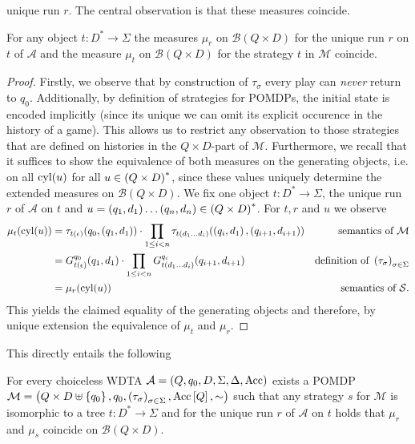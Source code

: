 unique run $r$. The central observation is that these measures coincide.
\begin{lemma}
  For any object $t:D^{*}\rightarrow\Sigma$ the measures $\mu_{r}$ on 
  $\mathcal{B}(Q\times D)$ for the unique run $r$ on $t$ of $\mathcal{A}$ and
  the measure $\mu_{t}$ on $\mathcal{B}(Q\times D)$ for the strategy $t$ in
  $\mathcal{M}$ coincide.
  \label{lem:stratistree}
\end{lemma}
\begin{proof}
  Firstly, we observe that by construction of $\tau_{\sigma}$ every play can
  \emph{never} return to $q_{0}$. Additionally, by definition of strategies for
  \acp{POMDP}, the initial state is encoded implicitly (since its unique we can
  omit its explicit occurence in the history of a game). This allows us to 
  restrict any observation to those strategies that are defined on histories in
  the $Q\times D$-part of $\mathcal{M}$. Furthermore, we recall that it 
  suffices to show the equivalence of both measures on the generating objects, 
  i.e. on all $\operatorname{cyl}(u)$ for all $u\in\left(Q\times D\right)^{*}$, since these values 
  uniquely determine the extended measures on $\mathcal{B}(Q\times D)$. We fix 
  one object $t:D^{*}\rightarrow\Sigma$, the unique run $r$ of $\mathcal{A}$ 
  on $t$ and
  $u = \left(q_{1}, d_{1}\right)\dots\left(q_{n}, d_{n}\right)\in\left(Q\times D\right)^{*}$. 
  For $t,r$ and $u$ we observe
  \begin{align*}
    \mu_{t}(\operatorname{cyl}(u)) &= \tau_{t(\epsilon)}(q_{0}, \left(q_{1}, d_{1}\right))\cdot
      \prod\limits_{1\leq i < n}\tau_{t(d_{1}\dots d_{i})}(
        \left(q_{i}, d_{1}\right), \left(q_{i+1}, d_{i+1}\right))&
          \text{semantics of }\mathcal{M}\\
    &= G_{t(\epsilon)}^{q_{0}}(q_{1}, d_{1})\cdot\prod\limits_{1\leq i < n}
      G_{t(d_{1}\dots d_{i})}^{q_{i}}(q_{i+1}, d_{i+1})&
          \text{definition of }\left(\tau_{\sigma}\right)_{\sigma\in\Sigma}\\
    &= \mu_{r}(\operatorname{cyl}(u))&\text{semantics of }\mathcal{S}.
  \end{align*}
  This yields the claimed equality of the generating objects and therefore, by
  unique extension the equivalence of $\mu_{t}$ and $\mu_{r}$.
\end{proof}

This directly entails the following
\begin{theorem}
  For every choiceless \ac{WDTA} 
  $\mathcal{A} = \left(Q, q_{0}, D, \Sigma, \Delta, \operatorname{Acc}\right)$ exists a \ac{POMDP}
  $\mathcal{M} = \left(Q\times D\uplus\left\{q_{0}\right\}, q_{0}, 
  \left(\tau_{\sigma}\right)_{\sigma\in\Sigma}, \operatorname{Acc}\left[Q\right], \sim\right)$ such that
  any strategy $s$ for $\mathcal{M}$ is isomorphic to a tree
  $t:D^{*}\rightarrow\Sigma$ and for the unique run $r$ of $\mathcal{A}$ on $t$
  holds that $\mu_{r}$ and $\mu_{s}$ coincide on $\mathcal{B}(Q\times D)$.
  \label{thm:wdtaemptinesspomdp}
\end{theorem}

